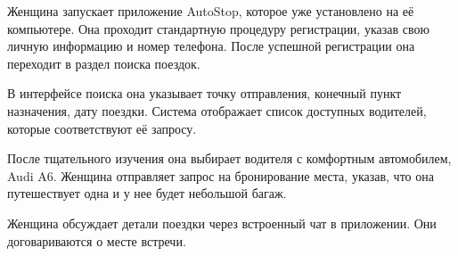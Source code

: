 Женщина запускает приложение AutoStop, которое уже установлено на её компьютере. Она проходит стандартную процедуру регистрации, указав свою личную информацию и номер телефона. После успешной регистрации она переходит в раздел поиска поездок.

В интерфейсе поиска она указывает точку отправления, конечный пункт назначения, дату поездки. Система отображает список доступных водителей, которые соответствуют её запросу.

После тщательного изучения она выбирает водителя с комфортным автомобилем, Audi A6. Женщина отправляет запрос на бронирование места, указав, что она путешествует одна и у нее будет небольшой багаж.

Женщина обсуждает детали поездки через встроенный чат в приложении. Они договариваются о месте встречи.
